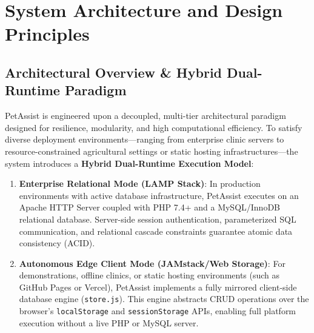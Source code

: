 \documentclass[conference]{IEEEtran}
\begin{document}
\section{System Architecture and Design Principles}
\subsection{Architectural Overview \& Hybrid Dual-Runtime Paradigm}
PetAssist is engineered upon a decoupled, multi-tier architectural paradigm designed for resilience, modularity, and high computational efficiency. To satisfy diverse deployment environments---ranging from enterprise clinic servers to resource-constrained agricultural settings or static hosting infrastructures---the system introduces a \textbf{Hybrid Dual-Runtime Execution Model}:
\begin{enumerate}
    \item \textbf{Enterprise Relational Mode (LAMP Stack)}: In production environments with active database infrastructure, PetAssist executes on an Apache HTTP Server coupled with PHP 7.4+ and a MySQL/InnoDB relational database. Server-side session authentication, parameterized SQL communication, and relational cascade constraints guarantee atomic data consistency (ACID).
    \item \textbf{Autonomous Edge Client Mode (JAMstack/Web Storage)}: For demonstrations, offline clinics, or static hosting environments (such as GitHub Pages or Vercel), PetAssist implements a fully mirrored client-side database engine (\texttt{store.js}). This engine abstracts CRUD operations over the browser's \texttt{localStorage} and \texttt{sessionStorage} APIs, enabling full platform execution without a live PHP or MySQL server.
\end{enumerate}
\end{document}

